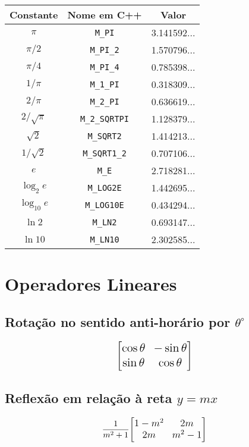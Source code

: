 \documentclass[10pt, a4paper, oneside]{book}
\begin{document}
\begin{center}
\begin{tabular}{|c|c|c|}
  \hline
  Constante & Nome em C++ & Valor \\
  \hline
  $\pi$ & \texttt{M\_PI} & 3.141592... \\
  \hline
  $\pi / 2$ & \texttt{M\_PI\_2} & 1.570796... \\
  \hline
  $\pi / 4$ & \texttt{M\_PI\_4} & 0.785398... \\
  \hline
  $1 / \pi$ & \texttt{M\_1\_PI} & 0.318309... \\
  \hline
  $2 / \pi$ & \texttt{M\_2\_PI} & 0.636619... \\
  \hline
  $2 / \sqrt{\pi}$ & \texttt{M\_2\_SQRTPI} & 1.128379... \\
  \hline
  $\sqrt{2}$ & \texttt{M\_SQRT2} & 1.414213... \\
  \hline
  $1 / \sqrt{2}$ & \texttt{M\_SQRT1\_2} & 0.707106... \\
  \hline
  $e$ & \texttt{M\_E} & 2.718281... \\
  \hline
  $\log_2{e}$ & \texttt{M\_LOG2E} & 1.442695... \\
  \hline
  $\log_{10}{e}$ & \texttt{M\_LOG10E} & 0.434294... \\
  \hline
  $\ln{2}$ & \texttt{M\_LN2} & 0.693147... \\
  \hline
  $\ln{10}$ & \texttt{M\_LN10} & 2.302585... \\
  \hline
\end{tabular}
\end{center}

\section{Operadores Lineares}

\subsection{Rotação no sentido anti-horário por $\theta ^\circ$}
\begin{equation*} 
\Large{
\begin{bmatrix}
    \cos \theta & -\sin \theta \\
    \sin \theta & \cos \theta
\end{bmatrix}
}
\end{equation*}

\subsection{Reflexão em relação à reta $y = mx$ }
\begin{equation*}
\LARGE{\frac{1}{m^2+1}}
\large{
\begin{bmatrix}
    1 - m^2 & 2m \\
    2m & m^2 - 1
\end{bmatrix}
}  
\end{equation*} 
\end{document}
